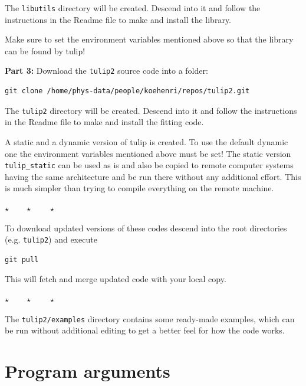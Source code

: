 \documentclass[a4paper,12pt,pdftex,onecolumn]{article}
\newcommand{\stars}{\begin{center}%
\vspace{1em plus 0.5em minus 0.5em}%
$\star \qquad \star \qquad \star$%
\vspace{1em plus 0.5em minus 0.5em}%
\end{center}}
\begin{document}
The \verb+libutils+ directory will be created. Descend into it and
follow the instructions in the Readme file to make and install the
library.

Make sure to set the environment variables mentioned above so that
the library can be found by tulip!


{\large \bf Part 3:}
Download the \verb+tulip2+ source code into a folder:

\begin{framed}
\begin{verbatim}
git clone /home/phys-data/people/koehenri/repos/tulip2.git
\end{verbatim}
\end{framed}

The \verb+tulip2+ directory will be created. Descend into it and
follow the instructions in the Readme file to make and install the
fitting code.

A static and a dynamic version of tulip is created.
To use the default dynamic one the environment variables
mentioned above must be set! The static version
\verb+tulip_static+ can be used as is and also be copied to remote
computer systems having the same architecture and be run there
without any additional effort. This is much simpler than trying to
compile everything on the remote machine.


\stars

To download updated versions of these codes descend into the root
directories (e.g. \verb+tulip2+) and execute

\begin{Verbatim}[fontsize=\relsize{-1},frame=single]
git pull
\end{Verbatim}

This will fetch and merge updated code with your local copy.

\stars

The \verb+tulip2/examples+ directory contains some ready-made examples,
which can be run without additional editing to get a better feel
for how the code works.




\section{Program arguments}
\end{document}
